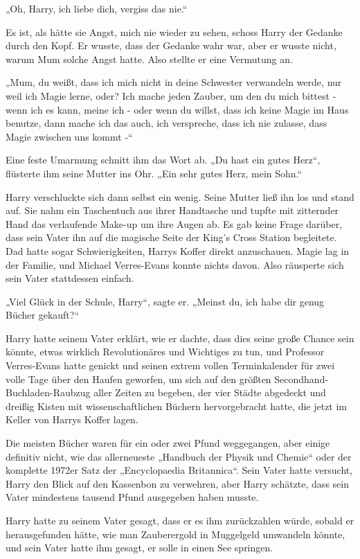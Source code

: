 {„Oh, Harry, ich liebe dich, vergiss das nie.“

Es ist, als hätte sie Angst, mich nie wieder zu sehen, schoss Harry der Gedanke durch den Kopf. Er wusste, dass der Gedanke wahr war, aber er wusste nicht, warum Mum solche Angst hatte. Also stellte er eine Vermutung an.

„Mum, du weißt, dass ich mich nicht in deine Schwester verwandeln werde, nur weil ich Magie lerne, oder? Ich mache jeden Zauber, um den du mich bittest - wenn ich es kann, meine ich - oder wenn du willst, dass ich keine Magie im Haus benutze, dann mache ich das auch, ich verspreche, dass ich nie zulasse, dass Magie zwischen uns kommt -“

Eine feste Umarmung schnitt ihm das Wort ab. „Du hast ein gutes Herz“, flüsterte ihm seine Mutter ins Ohr. „Ein sehr gutes Herz, mein Sohn.“

Harry verschluckte sich dann selbst ein wenig. Seine Mutter ließ ihn los und stand auf. Sie nahm ein Taschentuch aus ihrer Handtasche und tupfte mit zitternder Hand das verlaufende Make-up um ihre Augen ab. Es gab keine Frage darüber, dass sein Vater ihn auf die magische Seite der King's Cross Station begleitete. Dad hatte sogar Schwierigkeiten, Harrys Koffer direkt anzuschauen. Magie lag in der Familie, und Michael Verres-Evans konnte nichts davon. Also räusperte sich sein Vater stattdessen einfach.

„Viel Glück in der Schule, Harry“, sagte er. „Meinst du, ich habe dir genug Bücher gekauft?“

Harry hatte seinem Vater erklärt, wie er dachte, dass dies seine große Chance sein könnte, etwas wirklich Revolutionäres und Wichtiges zu tun, und Professor Verres-Evans hatte genickt und seinen extrem vollen Terminkalender für zwei volle Tage über den Haufen geworfen, um sich auf den größten Secondhand-Buchladen-Raubzug aller Zeiten zu begeben, der vier Städte abgedeckt und dreißig Kisten mit wissenschaftlichen Büchern hervorgebracht hatte, die jetzt im Keller von Harrys Koffer lagen.

Die meisten Bücher waren für ein oder zwei Pfund weggegangen, aber einige definitiv nicht, wie das allerneueste „Handbuch der Physik und Chemie“ oder der komplette 1972er Satz der „Encyclopaedia Britannica“. Sein Vater hatte versucht, Harry den Blick auf den Kassenbon zu verwehren, aber Harry schätzte, dass sein Vater mindestens tausend Pfund ausgegeben haben musste.

Harry hatte zu seinem Vater gesagt, dass er es ihm zurückzahlen würde, sobald er herausgefunden hätte, wie man Zauberergold in Muggelgeld umwandeln könnte, und sein Vater hatte ihm gesagt, er solle in einen See springen.

}
